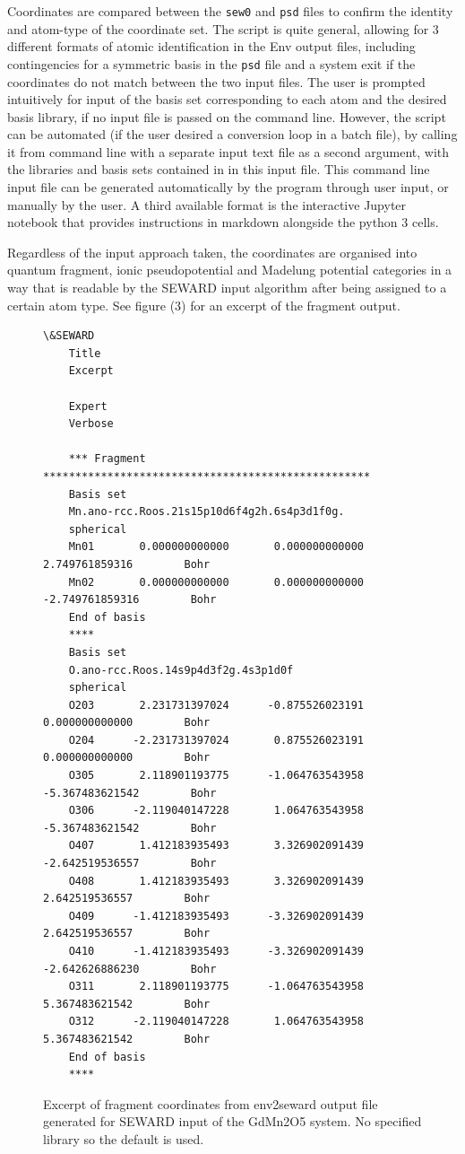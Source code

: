 \documentclass[10pt]{article}
\begin{document}
Coordinates are compared between the \texttt{sew0} and \texttt{psd} files to confirm the identity and atom-type of the coordinate set. The script is quite general, allowing for 3 different formats of atomic identification in the Env output files, including contingencies for a symmetric basis in the \texttt{psd} file and a system exit if the coordinates do not match between the two input files. The user is prompted intuitively for input of the basis set corresponding to each atom and the desired basis library, if no input file is passed on the command line. However, the script can be automated (if the user desired a conversion loop in a batch file), by calling it from command line with a separate input text file as a second argument, with the libraries and basis sets contained in in this input file. This command line input file can be generated automatically by the program through user input, or manually by the user. A third available format is the interactive Jupyter notebook that provides instructions in markdown alongside the python 3 cells.

Regardless of the input approach taken, the coordinates are organised into quantum fragment, ionic pseudopotential and Madelung potential categories in a way that is readable by the SEWARD input algorithm after being assigned to a certain atom type. See figure (3) for an excerpt of the fragment output.


\begin{figure}[htbp]
	\hspace*{-2.5cm}
	\begin{BVerbatim}[fontsize=\small]
	\&SEWARD
	Title
	Excerpt
	
	Expert
	Verbose
	
	*** Fragment ***************************************************
	Basis set
	Mn.ano-rcc.Roos.21s15p10d6f4g2h.6s4p3d1f0g.
	spherical
	Mn01       0.000000000000       0.000000000000       2.749761859316        Bohr
	Mn02       0.000000000000       0.000000000000      -2.749761859316        Bohr
	End of basis
	****
	Basis set
	O.ano-rcc.Roos.14s9p4d3f2g.4s3p1d0f
	spherical
	O203       2.231731397024      -0.875526023191       0.000000000000        Bohr
	O204      -2.231731397024       0.875526023191       0.000000000000        Bohr
	O305       2.118901193775      -1.064763543958      -5.367483621542        Bohr
	O306      -2.119040147228       1.064763543958      -5.367483621542        Bohr
	O407       1.412183935493       3.326902091439      -2.642519536557        Bohr
	O408       1.412183935493       3.326902091439       2.642519536557        Bohr
	O409      -1.412183935493      -3.326902091439       2.642519536557        Bohr
	O410      -1.412183935493      -3.326902091439      -2.642626886230        Bohr
	O311       2.118901193775      -1.064763543958       5.367483621542        Bohr
	O312      -2.119040147228       1.064763543958       5.367483621542        Bohr
	End of basis
	****
	\end{BVerbatim}
	\caption{Excerpt of fragment coordinates from env2seward output file generated for SEWARD input of the GdMn2O5 system. No specified library so the default is used.}
\end{figure}
\end{document}
